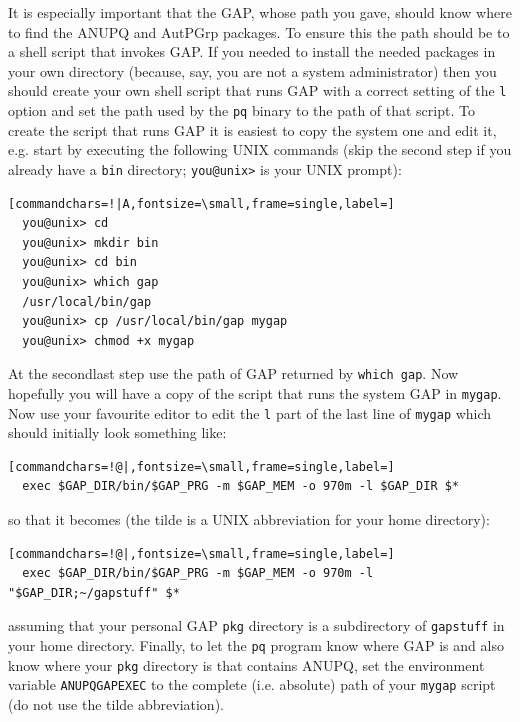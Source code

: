 \documentclass[a4paper,11pt]{report}
\begin{document}
{{ It is especially important that the \textsf{GAP}, whose path you gave, should know where to find the \textsf{ANUPQ} and \textsf{AutPGrp} packages. To ensure this the path should be to a shell script that invokes \textsf{GAP}. If you needed to install the needed packages in your own directory (because,
say, you are not a system administrator) then you should create your own shell
script that runs \textsf{GAP} with a correct setting of the \texttt{\texttt{}l} option and set the path used by the \texttt{pq} binary to the path of that script. To create the script that runs \textsf{GAP} it is easiest to copy the system one and edit it, e.g. start by executing the
following UNIX commands (skip the second step if you already have a \texttt{bin} directory; \texttt{you@unix{\textgreater}} is your UNIX prompt): 
\begin{Verbatim}[commandchars=!|A,fontsize=\small,frame=single,label=]
  you@unix> cd
  you@unix> mkdir bin
  you@unix> cd bin
  you@unix> which gap
  /usr/local/bin/gap
  you@unix> cp /usr/local/bin/gap mygap
  you@unix> chmod +x mygap
\end{Verbatim}
 At the second\texttt{}last step use the path of \textsf{GAP} returned by \texttt{which gap}. Now hopefully you will have a copy of the script that runs the system \textsf{GAP} in \texttt{mygap}. Now use your favourite editor to edit the \texttt{\texttt{}l} part of the last line of \texttt{mygap} which should initially look something like: 
\begin{Verbatim}[commandchars=!@|,fontsize=\small,frame=single,label=]
  exec $GAP_DIR/bin/$GAP_PRG -m $GAP_MEM -o 970m -l $GAP_DIR $*
\end{Verbatim}
 so that it becomes (the tilde is a UNIX abbreviation for your home directory): 
\begin{Verbatim}[commandchars=!@|,fontsize=\small,frame=single,label=]
  exec $GAP_DIR/bin/$GAP_PRG -m $GAP_MEM -o 970m -l "$GAP_DIR;~/gapstuff" $*
\end{Verbatim}
 assuming that your personal \textsf{GAP} \texttt{pkg} directory is a subdirectory of \texttt{gapstuff} in your home directory. Finally, to let the \texttt{pq} program know where \textsf{GAP} is and also know where your \texttt{pkg} directory is that contains \textsf{ANUPQ}, set the environment variable \texttt{ANUPQ{\textunderscore}GAP{\textunderscore}EXEC} to the complete (i.e. absolute) path of your \texttt{mygap} script (do not use the tilde abbreviation). }

 }
\end{document}
